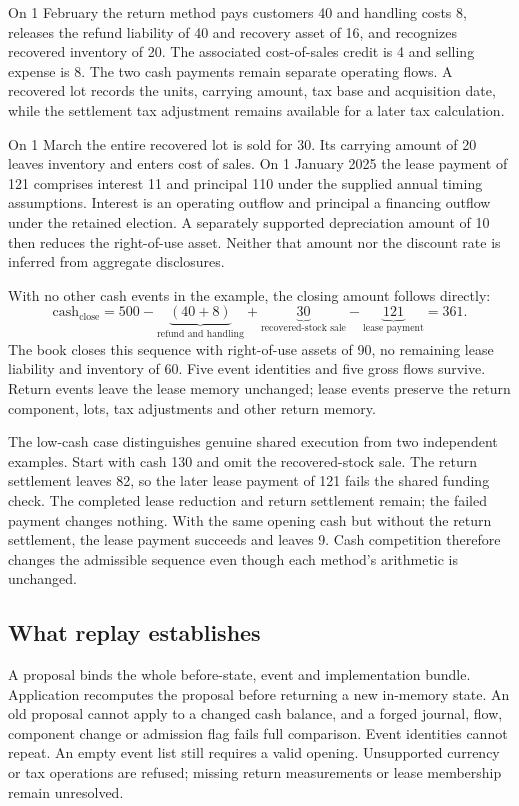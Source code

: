 On 1 February the return method pays customers 40 and handling costs 8,
releases the refund liability of 40 and recovery asset of 16, and recognizes
recovered inventory of 20. The associated cost-of-sales credit is 4 and selling
expense is 8. The two cash payments remain separate operating flows. A recovered
lot records the units, carrying amount, tax base and acquisition date, while
the settlement tax adjustment remains available for a later tax calculation.

On 1 March the entire recovered lot is sold for 30. Its carrying amount of 20
leaves inventory and enters cost of sales. On 1 January 2025 the lease payment
of 121 comprises interest 11 and principal 110 under the supplied annual
timing assumptions. Interest is an operating outflow and principal a financing
outflow under the retained election. A separately supported depreciation
amount of 10 then reduces the right-of-use asset. Neither that amount nor the
discount rate is inferred from aggregate disclosures.

With no other cash events in the example, the closing amount follows directly:
\[
 \mathrm{cash}_{\mathrm{close}}
 =500-\underbrace{(40+8)}_{\text{refund and handling}}
       +\underbrace{30}_{\text{recovered-stock sale}}
       -\underbrace{121}_{\text{lease payment}}
 =361.
\]
The book closes this sequence with right-of-use assets of 90, no remaining
lease liability and inventory of 60. Five event identities and five gross
flows survive. Return events leave the lease memory unchanged; lease events
preserve the return component, lots, tax adjustments and other return memory.

The low-cash case distinguishes genuine shared execution from two independent
examples. Start with cash 130 and omit the recovered-stock sale. The return
settlement leaves 82, so the later lease payment of 121 fails the shared funding
check. The completed lease reduction and return settlement remain; the failed
payment changes nothing. With the same opening cash but without the return
settlement, the lease payment succeeds and leaves 9. Cash competition therefore
changes the admissible sequence even though each method's arithmetic is
unchanged.

\subsection{What replay establishes}

A proposal binds the whole before-state, event and implementation bundle.
Application recomputes the proposal before returning a new in-memory state.
An old proposal cannot apply to a changed cash balance, and a forged journal,
flow, component change or admission flag fails full comparison. Event identities
cannot repeat. An empty event list still requires a valid opening. Unsupported
currency or tax operations are refused; missing return measurements or lease
membership remain unresolved.

